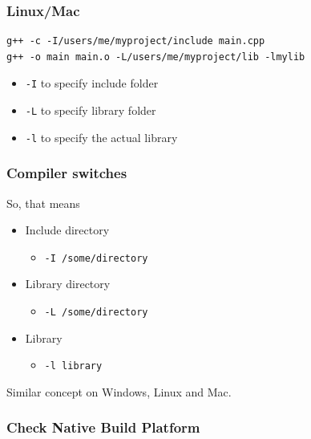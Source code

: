 \subsubsection{Linux/Mac}\label{linuxmac}

\begin{verbatim}
g++ -c -I/users/me/myproject/include main.cpp
g++ -o main main.o -L/users/me/myproject/lib -lmylib
\end{verbatim}

\begin{itemize}
\itemsep1pt\parskip0pt
\item
  \texttt{-I} to specify include folder
\item
  \texttt{-L} to specify library folder
\item
  \texttt{-l} to specify the actual library
\end{itemize}

\subsubsection{Compiler switches}\label{compiler-switches}

So, that means

\begin{itemize}
\itemsep1pt\parskip0pt
\item
  Include directory

  \begin{itemize}
  \itemsep1pt\parskip0pt
  \item
    \texttt{-I /some/directory}
  \end{itemize}
\item
  Library directory

  \begin{itemize}
  \itemsep1pt\parskip0pt
  \item
    \texttt{-L /some/directory}
  \end{itemize}
\item
  Library

  \begin{itemize}
  \itemsep1pt\parskip0pt
  \item
    \texttt{-l library}
  \end{itemize}
\end{itemize}

Similar concept on Windows, Linux and Mac.

\subsubsection{Check Native Build
Platform}\label{check-native-build-platform}

